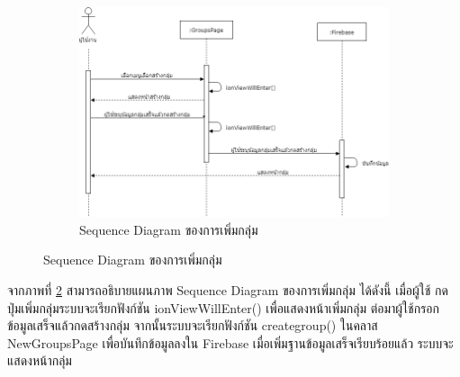 \begin{figure}
	\begin{figure}[H]
		\centering
		\includegraphics[width=0.8\columnwidth]
		{Figures/3/Sequence/addgroup}
		\caption{Sequence Diagram ของการเพิ่มกลุ่ม}
		\label{Fig:Sequence-addgroup}
	\end{figure}
\end{figure}
	จากภาพที่ \ref{Fig:Sequence-addgroup} สามารถอธิบายแผนภาพ Sequence Diagram ของการเพิ่มกลุ่ม ได้ดังนี้ เมื่อผู้ใช้
	กดปุ่มเพิ่มกลุ่มระบบจะเรียกฟังก์ชัน ionViewWillEnter() เพื่อแสดงหน้าเพิ่มกลุ่ม ต่อมาผู้ใช้กรอกข้อมูลเสร็จแล้วกดสร้างกลุ่ม 
	จากนั้นระบบจะเรียกฟังก์ชัน creategroup() ในคลาส NewGroupsPage เพื่อบันทึกข้อมูลลงใน Firebase เมื่อเพิ่มฐานข้อมูลเสร็จเรียบร้อยแล้ว 
	ระบบจะแสดงหน้ากลุ่ม
	\newpage	


